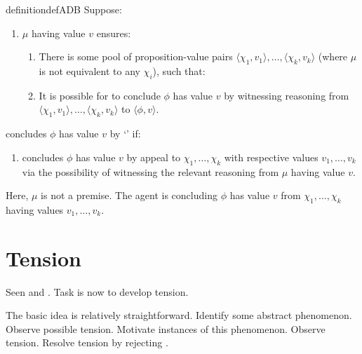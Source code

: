 \begin{note}
  \begin{restatable}[\adB{}]{definition}{defADB}
    \label{AR:adB}
    \label{def:adB}
    Suppose:
    \begin{enumerate}[label=\textsf{I:\arabic*}., ref=(\textsf{I}:\arabic*), series=adB_counter]
    \item
      \label{def:adB:poss}
      \(\mu\) having value \(v\) ensures:
      \begin{enumerate}
      \item
        There is some pool of proposition-value pairs \(\langle \chi_{1},v_{1} \rangle,\dots,\langle \chi_{k},v_{k} \rangle\) (where \(\mu\) is not equivalent to any \(\chi_{i}\)), such that:
      \item
        It is possible for \vAgent{} to conclude \(\phi\) has value \(v\) by witnessing reasoning from \(\langle \chi_{1},v_{1} \rangle,\dots,\langle \chi_{k},v_{k} \rangle\) to \(\langle \phi,v \rangle\).
      \end{enumerate}
    \end{enumerate}
    \vAgent{} concludes \(\phi\) has value \(v\) by `\adB{}' if:
    \begin{enumerate}[label=\textsf{I}:\arabic*., ref=(\textsf{I}:\arabic*), resume*=adB_counter]
    \item
      \label{def:adB:inter}
      \vAgent{} concludes \(\phi\) has value \(v\) by appeal to \(\chi_{1},\dots,\chi_{k}\) with respective values \(v_{1},\dots,v_{k}\) via the possibility of witnessing the relevant reasoning from \(\mu\) having value \(v\).
    \end{enumerate}
    \vspace{-\baselineskip}
  \end{restatable}

  Here, \(\mu\) is not a premise.
  The agent is concluding \(\phi\) has value \(v\) from \(\chi_{1},\dots,\chi_{k}\) having values \(v_{1},\dots,v_{k}\).
\end{note}

\section{Tension}
\label{sec:tension}

\begin{note}[Intro]
  Seen \csN{} and \ESU{}.
  Task is now to develop tension.
\end{note}

\begin{note}
  The basic idea is relatively straightforward.
  Identify some abstract phenomenon.
  Observe possible tension.
  Motivate instances of this phenomenon.
  Observe tension.
  Resolve tension by rejecting \ESU{}.
\end{note}

